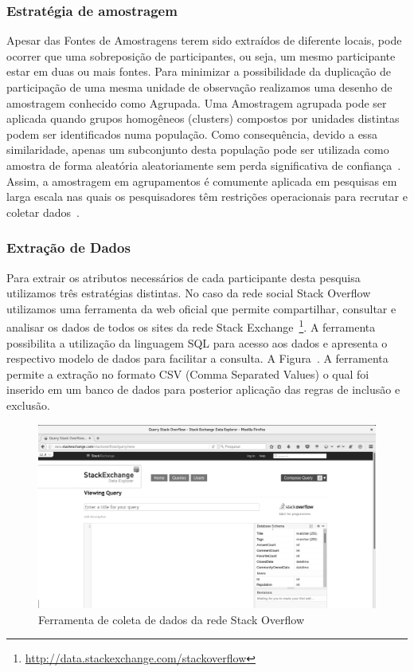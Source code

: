 \subsubsection{Estratégia de amostragem}

Apesar das Fontes de Amostragens terem sido extraídos de diferente locais, pode
ocorrer que uma sobreposição de participantes, ou seja, um mesmo participante
estar em duas ou mais fontes. Para minimizar a possibilidade da duplicação de
participação de uma mesma unidade de observação realizamos uma  desenho de
amostragem conhecido como Agrupada. Uma Amostragem agrupada pode ser aplicada
quando grupos homogêneos (clusters) compostos por unidades distintas podem ser
identificados numa população. Como consequência, devido a essa similaridade,
apenas um subconjunto desta população pode ser utilizada como amostra de forma
aleatória aleatoriamente sem perda significativa de
confiança~\cite{thompson2012sampling}. Assim, a amostragem em  agrupamentos é
comumente aplicada em pesquisas em larga escala nas quais os pesquisadores têm
restrições operacionais para recrutar e coletar
dados~\cite{roberts2004mortality}.

\subsubsection{Extração de Dados}

Para extrair os atributos necessários de cada participante desta pesquisa
utilizamos três estratégias distintas. No caso da rede social Stack Overflow
utilizamos uma ferramenta da web oficial que permite compartilhar, consultar e
analisar os dados de todos os sites da rede Stack
Exchange~\footnote{\url{http://data.stackexchange.com/stackoverflow}}. A
ferramenta possibilita a utilização da linguagem SQL para acesso aos dados e
apresenta o respectivo modelo de dados para facilitar a consulta. A
Figura~\cite{fig:stack-exchange}. A ferramenta permite a extração no formato CSV
(Comma Separated Values) o qual foi inserido em um banco de dados para posterior
aplicação das regras de inclusão e exclusão.

\begin{figure}[htpb]
	\centering
	\includegraphics[width=0.8\linewidth]{./chapter-pesquisa-com-profissionais/img/stack-exchange.png}
	\caption{Ferramenta de coleta de dados da rede Stack Overflow}
\label{fig:stack-exchange}
\end{figure}


